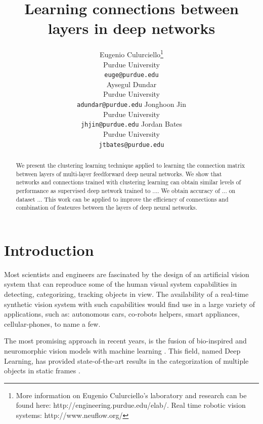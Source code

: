 \documentclass{article} %
\begin{document}
\title{Learning connections between layers in deep networks}

\author{
Eugenio Culurciello\thanks{More information on Eugenio Culurciello's laboratory and research can be found here: http://engineering.purdue.edu/elab/. Real time robotic vision systems: http://www.neuflow.org/} \\
Purdue University\\
\texttt{euge@purdue.edu} \\
\And
Aysegul Dundar \\
Purdue University\\
\texttt{adundar@purdue.edu}
\AND
Jonghoon Jin \\
Purdue University\\
\texttt{jhjin@purdue.edu}
\And
Jordan Bates \\
Purdue University\\
\texttt{jtbates@purdue.edu}
}


\maketitle

\begin{abstract}
We present the clustering learning technique applied to learning the connection matrix between layers of multi-layer feedforward deep neural networks. We show that networks and connections trained with clustering learning can obtain similar levels of performance as supervised deep network trained to .... 
We obtain accuracy of ... on dataset ...
This work can be applied to improve the efficiency of connections and combination of feateures between the layers of deep neural networks.
\end{abstract}


\section{Introduction}

Most scientists and engineers are fascinated by the design of an artificial vision system that can reproduce some of the human visual system capabilities in detecting, categorizing, tracking objects in view. The availability of a real-time synthetic vision system with such capabilities would find use in a large variety of applications, such as: autonomous cars, co-robots helpers, smart appliances, cellular-phones, to name a few.
 
The most promising approach in recent years, is the fusion of bio-inspired and neuromorphic vision models with machine learning \cite{lecun_gradient-based_1998,hadsell_dimensionality_2006,gregor_structured_2011,riesenhuber_hierarchical_1999,serre_feedforward_2007,serre_neuromorphic_2010,jarrett_what_2009,lecun_convolutional_2010,boureau_theoretical_2010}. This field, named Deep Learning, has provided state-of-the-art results in the categorization of multiple objects in static frames \cite{Hinton, G. E., Srivastava, N., Krizhevsky, A., Sutskever, I. and Salakhutdinov, R. R. (2012)
Improving neural networks by preventing co-adaptation of feature detectors
http://arxiv.org/abs/1207.0580}.
\end{document}
